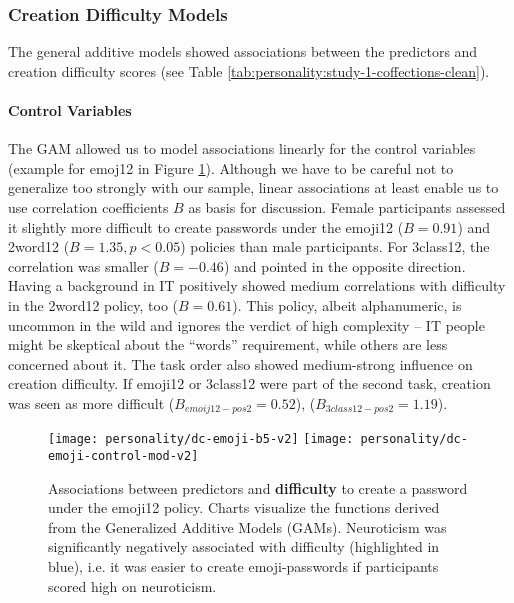 \subsubsection{Creation Difficulty Models}
The general additive models showed associations between the predictors and creation difficulty scores (see Table \ref{tab:personality:study-1-coffections-clean}). 

\paragraph{Control Variables} 
The GAM allowed us to model associations linearly for the control variables (example for emoj12 in Figure \ref{fig:personality:dc-emoji-b5}). Although we have to be careful not to generalize too strongly with our sample, linear associations at least enable us to use correlation coefficients $B$ as basis for discussion.
Female participants assessed it slightly more difficult to create passwords under the emoji12 ($B=0.91$) and 2word12 ($B=1.35, p<0.05$) policies than male participants. For 3class12, the correlation was smaller ($B=-0.46$) and pointed in the opposite direction. 
Having a background in IT positively showed medium correlations with difficulty in the 2word12 policy, too ($B=0.61$). This policy, albeit alphanumeric, is uncommon in the wild and ignores the verdict of high complexity -- IT people might be skeptical about the ``words'' requirement, while others are less concerned about it.
The task order also showed medium-strong influence on creation difficulty. If emoji12 or 3class12 were part of the second task, creation was seen as more difficult ($B_{emoij12-pos2}=0.52$),  ($B_{3class12-pos2}=1.19$). 


\begin{figure}
\texttt{[image: personality/dc-emoji-b5-v2]}
\texttt{[image: personality/dc-emoji-control-mod-v2]}
\caption{\label{fig:personality:dc-emoji-b5}Associations between predictors and \textbf{difficulty} to create a password under the emoji12 policy. Charts visualize the functions derived from the Generalized Additive Models (GAMs). Neuroticism was significantly negatively associated with difficulty (highlighted in blue), i.e. it was easier to create emoji-passwords if participants scored high on neuroticism.}
\end{figure}


